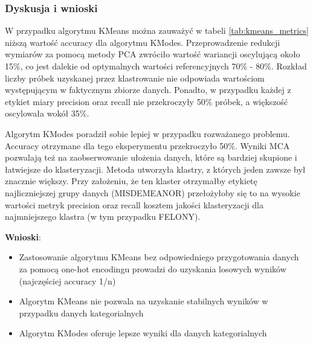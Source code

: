 \documentclass{classrep}
\begin{document}
{{            \subsubsection{Dyskusja i wnioski} {
                W przypadku algorytmu KMeans można zauważyć w tabeli
                \ref{tab:kmeans_metrics} niższą wartość accuracy dla algorytmu KModes.
                Przeprowadzenie redukcji wymiarów za pomocą metody PCA zwróciło wartość
                wariancji oscylującą około 15\%, co jest dalekie od optymalnych
                wartości referencyjnych 70\% - 80\%. Rozkład liczby próbek uzyskanej
                przez klastrowanie nie odpowiada wartościom występującym w faktycznym
                zbiorze danych. Ponadto, w przypadku każdej z etykiet miary precision
                oraz recall nie przekroczyły 50\% próbek, a większość oscylowała wokół
                35\%.

                Algorytm KModes poradził sobie lepiej w przypadku rozważanego problemu.
                Accuracy otrzymane dla tego eksperymentu przekroczyło 50\%. Wyniki MCA
                pozwalają też na zaobserwowanie ułożenia danych, które są bardziej
                skupione i łatwiejsze do klasteryzacji. Metoda utworzyła klastry, z
                których jeden zawsze był znacznie większy. Przy założeniu, że ten
                klaster otrzymałby etykietę najliczniejszej grupy danych (MISDEMEANOR)
                przełożyłoby się to na wysokie wartości metryk precision oraz recall
                kosztem jakości klasteryzacji dla najmniejszego klastra (w tym
                przypadku FELONY).
                 
                 \textbf{Wnioski}:
                 \begin{itemize}
                     \item Zastosowanie algorytmu KMeans bez odpowiedniego przygotowania
                     danych za pomocą one-hot encodingu prowadzi do uzyskania
                     losowych wyników (najczęściej accuracy 1/n)
                     \item Algorytm KMeans nie pozwala na uzyskanie stabilnych wyników w przypadku danych kategorialnych
                     \item Algorytm KModes oferuje lepsze wyniki dla danych kategorialnych
                 \end{itemize}
            }
        }
        \newpage
    }
    
\end{document}
